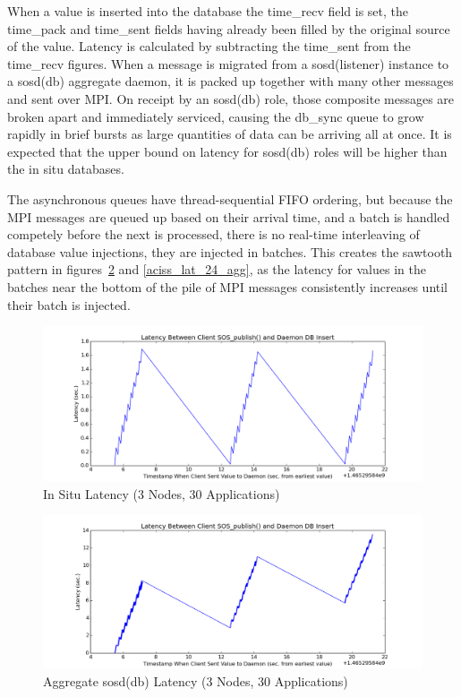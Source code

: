 When a value is inserted into the database the time\_recv field is set,
the time\_pack and time\_sent fields having already been filled by the
original source of the value.  Latency is calculated by subtracting
the time\_sent from the time\_recv figures. When a message is migrated
from a sosd(listener) instance to a sosd(db) aggregate daemon, it is
packed up together with many other messages and sent over MPI.  On
receipt by an sosd(db) role, those composite messages are broken apart
and immediately serviced, causing the db\_sync queue to grow rapidly in
brief bursts as large quantities of data can be arriving all at once.
It is expected that the upper bound on latency for sosd(db) roles will
be higher than the in situ databases.

The asynchronous queues have thread-sequential FIFO ordering, but
because the MPI messages are queued up based on their arrival time,
and a batch is handled competely before the next is processed, there
is no real-time interleaving of database value injections, they are
injected in batches. This creates the sawtooth pattern in
figures~\ref{aciss_lat_3_agg} and \ref{aciss_lat_24_agg}, as the latency for values in the
batches near the bottom of the pile of MPI messages consistently
increases until their batch is injected.

\begin{figure}[!t]
\centering
\includegraphics[width=5in]{images/aciss_latency_3_situ.png}
\caption{In Situ Latency (3 Nodes, 30 Applications)}
\label{aciss_lat_3_situ}
\end{figure}

\begin{figure}[!t]
\centering
\includegraphics[width=5in]{images/aciss_latency_3_agg.png}
\caption{Aggregate sosd(db) Latency (3 Nodes, 30 Applications)}
\label{aciss_lat_3_agg}
\end{figure}

